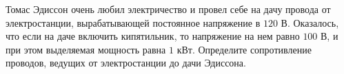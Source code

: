 Томас Эдиссон очень любил электричество и провел себе на дачу провода от электростанции, вырабатывающей постоянное напряжение в $120$ В. Оказалось, что если на даче включить кипятильник, то напряжение на нем равно $100$ В, и при этом выделяемая мощность равна $1$ кВт. Определите сопротивление проводов, ведущих от электростанции до дачи Эдиссона.
